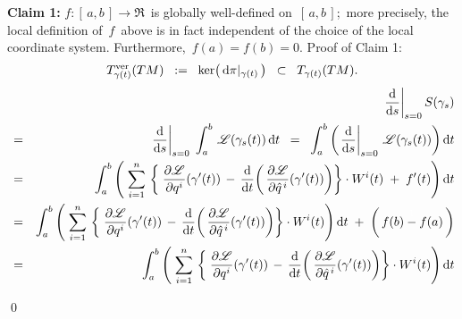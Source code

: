 \vskip 0.5cm
\noindent
\textbf{Claim 1:}
\vskip 0.1cm
\noindent
$f : [\,a,b\,] \longrightarrow \Re$\, is globally well-defined on \,$[\,a,b\,]$;\,
more precisely, the local definition of \,$f$\, above is in fact
independent of the choice of the local coordinate system.
Furthermore, \,$f(a) = f(b) = 0$.
\vskip 0.2cm
\noindent
Proof of Claim 1: \quad
\begin{equation*}
T^{\textnormal{ver}}_{\gamma(t)}(TM)
\;\; := \;\;
	\textnormal{ker}\!\left(\,\textnormal{d}\pi\vert_{\gamma(t)}\,\right)
\;\; \subset \;\;
	T_{\gamma(t)}(TM).
\end{equation*}
\begin{eqnarray*}
&&
	\left.\dfrac{\d}{\d s}\right\vert_{s=0} S\!\left(\gamma_{s}\right)
\\
& = &
	\left.\dfrac{\d}{\d s}\right\vert_{s=0}\; \int_{a}^{b}\,\mathscr{L}\!\left(\gamma_{s}(t)\right)\d t
\;\; = \;\;
	\int_{a}^{b}\left(\left.\dfrac{\d}{\d s}\right\vert_{s=0}\,\mathscr{L}\!\left(\gamma_{s}(t)\right)\right)\d t
\\
& = &
	\int_{a}^{b}\left(\;
		\overset{n}{\underset{i=1}{\sum}}\,\left\{\;
			\dfrac{\partial\mathscr{L}}{\partial q^{i}}\!\left(\gamma^{\prime}(t)\right)
			\, - \,
			\dfrac{\d}{\d t}\!\left(\,
				\dfrac{\partial\mathscr{L}}{\partial\hat{q}^{\,i}}\!\left(\gamma^{\prime}(t)\right)
				\right)
			\right\}
		\cdot
		W^{i}(t)
		\; + \;
		f^{\prime}(t)
		\right)\d t
\\
& = &
	\int_{a}^{b}\left(\;
		\overset{n}{\underset{i=1}{\sum}}\,\left\{\;
			\dfrac{\partial\mathscr{L}}{\partial q^{i}}\!\left(\gamma^{\prime}(t)\right)
			\, - \,
			\dfrac{\d}{\d t}\!\left(\,
				\dfrac{\partial\mathscr{L}}{\partial\hat{q}^{\,i}}\!\left(\gamma^{\prime}(t)\right)
				\right)
			\right\}
		\cdot
		W^{i}(t)
		\right)\d t
	\; + \;
	\left(\, f(b) \overset{{\color{white}1}}{-} f(a) \,\right)
\\
& = &
	\int_{a}^{b}\left(\;
		\overset{n}{\underset{i=1}{\sum}}\,\left\{\;
			\dfrac{\partial\mathscr{L}}{\partial q^{i}}\!\left(\gamma^{\prime}(t)\right)
			\, - \,
			\dfrac{\d}{\d t}\!\left(\,
				\dfrac{\partial\mathscr{L}}{\partial\hat{q}^{\,i}}\!\left(\gamma^{\prime}(t)\right)
				\right)
			\right\}
		\cdot
		W^{i}(t)
		\right)\d t
\end{eqnarray*}

\qed




